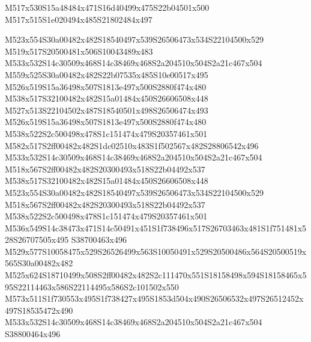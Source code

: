 \documentclass{article}
\begin{document}
\begin{multicols}{2}





\begin{center}
M517x530S15a48484x471S16d40499x475S22b04501x500 M517x515S1e020494x485S21802484x497 
\end{center}


M523x554S30a00482x482S18540497x539S26506473x534S22104500x529 M519x517S20500481x506S10043489x483 M533x532S14c30509x468S14c38469x468S2a204510x504S2a21c467x504 M559x525S30a00482x482S22b07535x485S10e00517x495 M526x519S15a36498x507S1813e497x500S2880f474x480 M538x517S32100482x482S15a01484x450S26606508x448 M527x513S22104502x487S18540501x498S26506474x493 M526x519S15a36498x507S1813e497x500S2880f474x480 M538x522S2c500498x478S1c151474x479S20357461x501 M582x517S2ff00482x482S1dc02510x483S1f502567x482S28806542x496 M533x532S14c30509x468S14c38469x468S2a204510x504S2a21c467x504 M518x567S2ff00482x482S20300493x518S22b04492x537 M538x517S32100482x482S15a01484x450S26606508x448 M523x554S30a00482x482S18540497x539S26506473x534S22104500x529 M518x567S2ff00482x482S20300493x518S22b04492x537 M538x522S2c500498x478S1c151474x479S20357461x501 M536x549S14c38473x471S14c50491x451S1f738496x517S26703463x481S1f751481x528S26707505x495 S38700463x496 M529x577S10058475x529S26526499x563S10050491x529S20500486x564S20500519x565S30a00482x482 M525x624S18710499x508S2ff00482x482S2c111470x551S18158498x594S18158465x595S22114463x586S22114495x586S2c101502x550 M573x511S1f730553x495S1f738427x495S1853d504x490S26506532x497S26512452x497S18535472x490 M533x532S14c30509x468S14c38469x468S2a204510x504S2a21c467x504 S38800464x496


\end{multicols}
\end{document}

